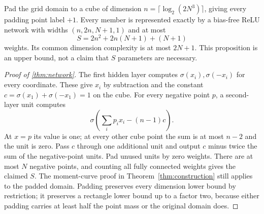 \begin{proposition}\label{thm:network}
Pad the grid domain to a cube of dimension $n=\lceil\log_2(2N^3)\rceil$, giving every padding point label $+1$. Every member is represented exactly by a bias-free ReLU network with widths $(n,2n,N+1,1)$ and at most
\[
 S=2n^2+2n(N+1)+(N+1)
\]
weights. Its common dimension complexity is at most $2N+1$. This proposition is an upper bound, not a claim that $S$ parameters are necessary.
\end{proposition}

\begin{proof}[Proof of \cref{thm:network}]
The first hidden layer computes $\sigma(x_i),\sigma(-x_i)$ for every coordinate. These give $x_i$ by subtraction and the constant $c=\sigma(x_1)+\sigma(-x_1)=1$ on the cube. For every negative point $p$, a second-layer unit computes
\[
 \sigma\left(\sum_i p_ix_i-(n-1)c\right).
\]
At $x=p$ its value is one; at every other cube point the sum is at most $n-2$ and the unit is zero. Pass $c$ through one additional unit and output $c$ minus twice the sum of the negative-point units. Pad unused units by zero weights. There are at most $N$ negative points, and counting all fully connected weights gives the claimed $S$. The moment-curve proof in Theorem~\ref{thm:construction} still applies to the padded domain. Padding preserves every dimension lower bound by restriction; it preserves a rectangle lower bound up to a factor two, because either padding carries at least half the point mass or the original domain does.
\end{proof}
